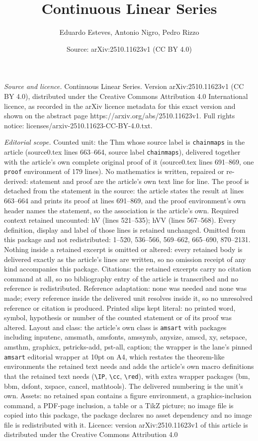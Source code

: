 \documentclass[10pt,a4paper]{amsart}
\title[Continuous Linear Series]{Continuous Linear Series}
\author{Eduardo Esteves, Antonio Nigro, Pedro Rizzo}
\date{Source: arXiv:2510.11623v1 (CC BY 4.0)}
\begin{document}
\maketitle

\noindent\emph{Source and licence.} Continuous Linear Series. Version arXiv:2510.11623v1 (CC BY 4.0), distributed under the Creative Commons Attribution 4.0 International licence, as recorded in the arXiv licence metadata for this exact version and shown on the abstract page https://arxiv.org/abs/2510.11623v1. Full rights notice: licenses/arxiv-2510.11623-CC-BY-4.0.txt.\par\smallskip

\noindent\textit{Editorial scope.} Counted unit: the Thm whose source label is \texttt{chainmaps} in the article (source0.tex lines 663--664, source label \texttt{chainmaps}), delivered together with the article's own complete original proof of it (source0.tex lines 691--869, one \texttt{proof} environment of 179 lines). No mathematics is written, repaired or re-derived: statement and proof are the article's own text line for line. The proof is detached from the statement in the source: the article states the result at lines 663--664 and prints its proof at lines 691--869, and the proof environment's own header names the statement, so the association is the article's own. Required context retained uncounted: hV (lines 521--535); hVV (lines 567--568). Every definition, display and label of those lines is retained unchanged. Omitted from this package and not redistributed: 1--520, 536--566, 569--662, 665--690, 870--2131. Nothing inside a retained excerpt is omitted or altered: every retained body is delivered exactly as the article's lines are written, so no omission receipt of any kind accompanies this package. Citations: the retained excerpts carry no citation command at all, so no bibliography entry of the article is transcribed and no reference is redistributed. Reference adaptation: none was needed and none was made; every reference inside the delivered unit resolves inside it, so no unresolved reference or citation is produced. Printed slips kept literal: no printed word, symbol, hypothesis or number of the counted statement or of its proof was altered. Layout and class: the article's own class is \texttt{amsart} with packages including inputenc, amsmath, amsfonts, amssymb, anysize, amscd, xy, setspace, amsthm, graphicx, pstricks-add, pst-all, caption; the wrapper is the lane's pinned \texttt{amsart} editorial wrapper at 10pt on A4, which restates the theorem-like environments the retained text needs and adds the article's own macro definitions that the retained text needs (\texttt{\textbackslash IP}, \texttt{\textbackslash cc}, \texttt{\textbackslash red}), with extra wrapper packages (bm, bbm, dsfont, xspace, cancel, mathtools). The delivered numbering is the unit's own. Assets: no retained span contains a figure environment, a graphics-inclusion command, a PDF-page inclusion, a table or a TikZ picture; no image file is copied into this package, the package declares no asset dependency and no image file is redistributed with it. Licence: version arXiv:2510.11623v1 of this article is distributed under the Creative Commons Attribution 4.0 
\end{document}
